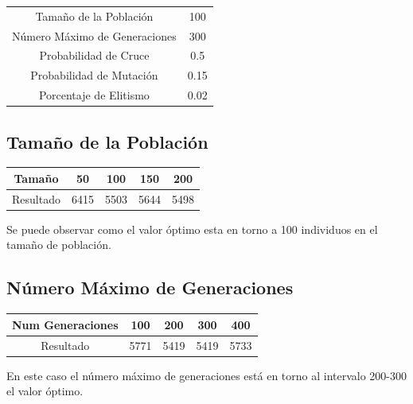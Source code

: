 \documentclass[12pt]{article}
\begin{document}
\begin{table}[H]
\begin{center}
\begin{tabular}{|cc|} \hline
Tamaño de la Población   & 100  \\  
Número Máximo de Generaciones  &  300 \\
Probabilidad de Cruce & 0.5 \\
Probabilidad de Mutación & 0.15 \\
Porcentaje de Elitismo & 0.02 \\ \hline
\end{tabular}
\end{center}
\end{table}


\subsection{Tamaño de la Población}

\begin{table}[H]
\begin{center}
\begin{tabular}{|ccccc|} \hline
Tamaño	   & 50 & 100 & 150 & 200 \\  \hline
Resultado  &  6415 & 5503 & 5644 & 5498 \\ \hline
\end{tabular}
\end{center}
\end{table}

	Se puede observar como el valor óptimo esta en torno a 100 individuos en el tamaño de población. 

\subsection{Número Máximo de Generaciones}
\begin{table}[H]
\begin{center}
\begin{tabular}{|ccccc|} \hline
Num Generaciones  & 100 & 200 & 300 & 400 \\  \hline
Resultado  &  5771 & 5419 & 5419 & 5733 \\ \hline
\end{tabular}
\end{center}
\end{table}	

	En este caso el número máximo de generaciones está en torno al intervalo 200-300 el valor óptimo.
\end{document}
